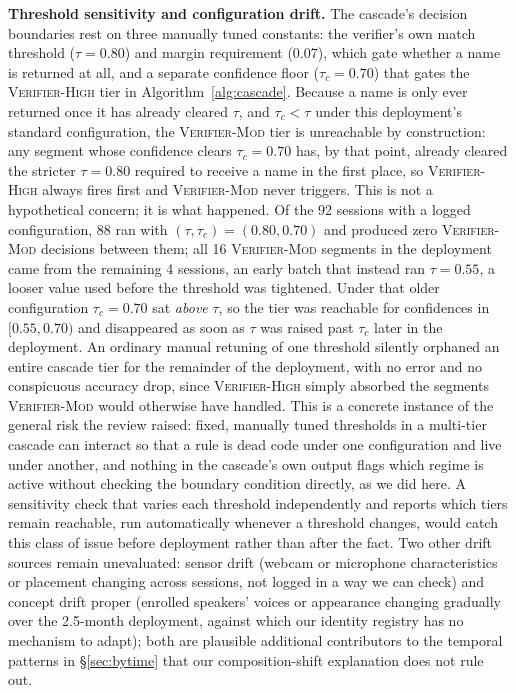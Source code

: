\documentclass[conference,a4paper]{IEEEtran}
\begin{document}
\textbf{Threshold sensitivity and configuration drift.} The cascade's
decision boundaries rest on three manually tuned constants: the
verifier's own match threshold ($\tau=0.80$) and margin requirement
(0.07), which gate whether a name is returned at all, and a separate
confidence floor ($\tau_c=0.70$) that gates the
\textsc{Verifier-High} tier in Algorithm~\ref{alg:cascade}. Because a
name is only ever returned once it has already cleared $\tau$, and
$\tau_c<\tau$ under this deployment's standard configuration, the
\textsc{Verifier-Mod} tier is unreachable by construction: any segment
whose confidence clears $\tau_c=0.70$ has, by that point, already
cleared the stricter $\tau=0.80$ required to receive a name in the
first place, so \textsc{Verifier-High} always fires first and
\textsc{Verifier-Mod} never triggers. This is not a hypothetical
concern; it is what happened. Of the 92 sessions with a logged
configuration, 88 ran with $(\tau,\tau_c)=(0.80,0.70)$ and produced
zero \textsc{Verifier-Mod} decisions between them; all 16
\textsc{Verifier-Mod} segments in the deployment came from the
remaining 4 sessions, an early batch that instead ran $\tau=0.55$, a
looser value used before the threshold was tightened. Under that
older configuration $\tau_c=0.70$ sat \emph{above} $\tau$, so the tier
was reachable for confidences in $[0.55,0.70)$ and disappeared as soon
as $\tau$ was raised past $\tau_c$ later in the deployment. An
ordinary manual retuning of one threshold silently orphaned an entire
cascade tier for the remainder of the deployment, with no error and no
conspicuous accuracy drop, since \textsc{Verifier-High} simply
absorbed the segments \textsc{Verifier-Mod} would otherwise have
handled. This is a concrete instance of the general risk the review
raised: fixed, manually tuned thresholds in a multi-tier cascade can
interact so that a rule is dead code under one configuration and live
under another, and nothing in the cascade's own output flags which
regime is active without checking the boundary condition directly, as
we did here. A sensitivity check that varies each threshold
independently and reports which tiers remain reachable, run
automatically whenever a threshold changes, would catch this class of
issue before deployment rather than after the fact. Two other drift
sources remain unevaluated: sensor drift (webcam or microphone
characteristics or placement changing across sessions, not logged in
a way we can check) and concept drift proper (enrolled speakers'
voices or appearance changing gradually over the 2.5-month deployment,
against which our identity registry has no mechanism to adapt); both
are plausible additional contributors to the temporal patterns in
\S\ref{sec:bytime} that our composition-shift explanation does not
rule out.
\end{document}
